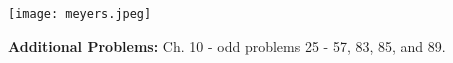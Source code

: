 \documentclass[11pt]{article}
\begin{document}
\begin{center}
  \texttt{[image: meyers.jpeg]}
\end{center}


\vfill
\textbf{Additional Problems:} Ch. 10 - odd problems 25 - 57, 83, 85, and 89.





\end{document}
